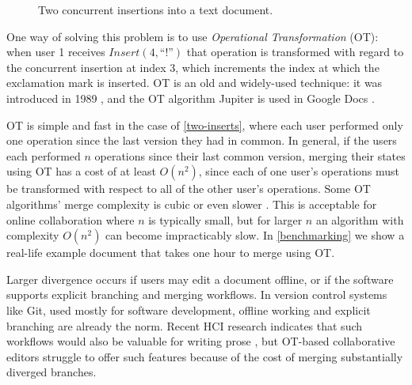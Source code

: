 \documentclass[sigplan,10pt]{acmart}
\begin{document}
\begin{figure}
  \centering
  \caption{Two concurrent insertions into a text document.}
  \label{two-inserts}
\end{figure}

One way of solving this problem is to use \emph{Operational Transformation} (OT): when user 1 receives $\mathit{Insert}(4, \text{``!''})$ that operation is transformed with regard to the concurrent insertion at index 3, which increments the index at which the exclamation mark is inserted.
OT is an old and widely-used technique: it was introduced in 1989 \cite{Ellis1989}, and the OT algorithm Jupiter \cite{Nichols1995} is used in Google Docs \cite{DayRichter2010}.

OT is simple and fast in the case of \autoref{two-inserts}, where each user performed only one operation since the last version they had in common.
In general, if the users each performed $n$ operations since their last common version, merging their states using OT has a cost of at least $O(n^2)$, since each of one user's operations must be transformed with respect to all of the other user's operations.
Some OT algorithms' merge complexity is cubic or even slower \cite{Li2006,Roh2011RGA,Sun2020OT}.
This is acceptable for online collaboration where $n$ is typically small, but for larger $n$ an algorithm with complexity $O(n^2)$ can become impracticably slow.
In \autoref{benchmarking} we show a real-life example document that takes one hour to merge using OT.

Larger divergence occurs if users may edit a document offline, or if the software supports explicit branching and merging workflows.
In version control systems like Git, used mostly for software development, offline working and explicit branching are already the norm.
Recent HCI research indicates that such workflows would also be valuable for writing prose \cite{Upwelling,Patchwork}, but OT-based collaborative editors struggle to offer such features because of the cost of merging substantially diverged branches.
\end{document}
